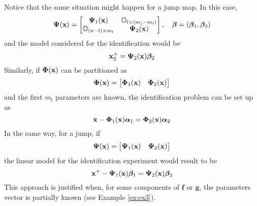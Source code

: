 Notice that the same situation might happen for a jump map. In this case, 
%
\begin{equation}
    \bm{\Psi}(\mathbf{x}) = \begin{bmatrix}\bm{\Psi}_1(\mathbf{x})&\mathbb{O}_{l\times (m_j-m_l)}\\\mathbb{O}_{(n-l)\times m_l}&\bm{\Psi}_2(\mathbf{x})\end{bmatrix},\quad\bm{\beta} = \left(\bm{\beta}_1,\bm{\beta}_2\right)
\end{equation}
%
and the model considered for the identification would be
%
\begin{equation}
    \label{eq:redjump}{\mathbf{x}}^+_2=\bm{\Psi}_2(\mathbf{x})\bm{\beta}_2
\end{equation}
%
Similarly, if $\bm{\Phi}(\mathbf{x})$ can be partitioned as
%
\begin{equation}
    \bm{\Phi}(\mathbf{x}) = \begin{bmatrix}\bm{\Phi}_1(\mathbf{x})&\bm{\Phi}_2(\mathbf{x})\end{bmatrix}
\end{equation}
%
and the first $m_l$ parameters are known, the identification problem can be set up as
%
\begin{equation}
    \dot{\mathbf{x}}-\bm{\Phi}_1(\mathbf{x})\bm{\alpha}_1=\bm{\Phi}_2(\mathbf{x})\bm{\alpha}_2
\end{equation}
%
In the same way, for a jump, if 
%
\begin{equation}
    \bm{\Psi}(\mathbf{x}) = \begin{bmatrix}\bm{\Psi}_1(\mathbf{x})&\bm{\Psi}_2(\mathbf{x})\end{bmatrix}
\end{equation}
%
the linear model for the identification experiment would result to be
%
\begin{equation}
    {\mathbf{x}}^+-\bm{\Psi}_1(\mathbf{x})\bm{\beta}_1=\bm{\Psi}_2(\mathbf{x})\bm{\beta}_2
\end{equation}
%
This approach is justified when, for some components of $\mathbf{f}$ or $\mathbf{g}$, the parameters vector is partially known (see Example \ref{ex:ex3}).
%
